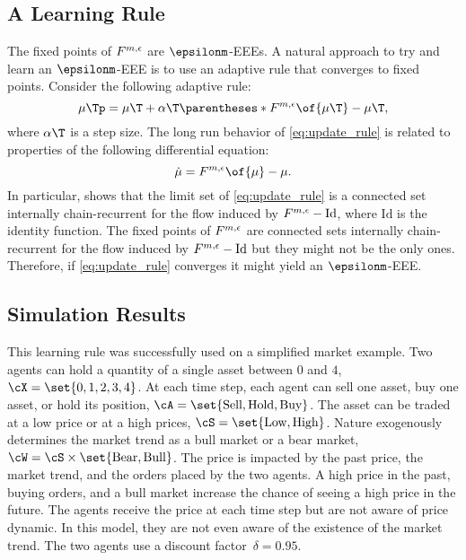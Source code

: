 \subsection{A Learning Rule}

The fixed points of \(F^{m, \epsilon}\) are \(\epsilonm\)-EEEs.
A natural approach to try and learn an \(\epsilonm\)-EEE is to use an adaptive rule that converges to fixed points.
Consider the following adaptive rule:
\begin{equation}
\label{eq:update_rule}
\mu\Tp = \mu\T + \alpha\T \parentheses*{\FF \of{\mu\T} - \mu\T},
\end{equation}
where \(\alpha\T\) is a step size.
The long run behavior of \cref{eq:update_rule} is related to properties of the following differential equation:
\begin{equation*}
\label{eq:differential_equation}
\dot{\mu} = \FF \of{\mu} - \mu.
\end{equation*}
In particular, \cite{benaim:1996} shows that the limit set of \cref{eq:update_rule} is a connected set internally chain-recurrent for the flow induced by \(F^{m, \epsilon} - \text{Id}\), where \(\text{Id}\) is the identity function.
The fixed points of \(F^{m, \epsilon}\) are connected sets internally chain-recurrent for the flow induced by \(F^{m, \epsilon} - \text{Id}\) but they might not be the only ones.
Therefore, if \cref{eq:update_rule} converges it might yield an \(\epsilonm\)-EEE.

\subsection{Simulation Results}
This learning rule was successfully used on a simplified market example.
Two agents can hold a quantity of a single asset between \(0\) and \(4\), \(\cX = \set{0,1,2,3,4}\).
At each time step, each agent can sell one asset, buy one asset, or hold its position, \(\cA = \set{\text{Sell}, \text{Hold}, \text{Buy}}\).
The asset can be traded at a low price or at a high prices, \(\cS=\set{\text{Low}, \text{High}}\).
Nature exogenously determines the market trend as a bull market or a bear market, \(\cW=\cS \times \set{\text{Bear}, \text{Bull}}\).
The price is impacted by the past price, the market trend, and the orders placed by the two agents.
A high price in the past, buying orders, and a bull market increase the chance of seeing a high price in the future.
The agents receive the price at each time step but are not aware of price dynamic.
In this model, they are not even aware of the existence of the market trend.
The two agents use a discount factor~\(\delta=0.95\).

